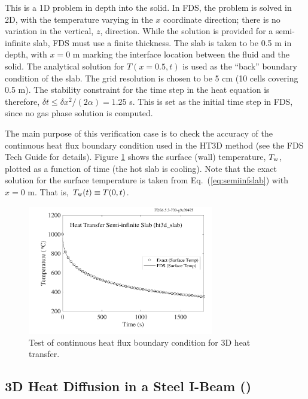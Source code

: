 \documentclass[11pt]{book}
\begin{document}
This is a 1D problem in depth into the solid.  In FDS, the problem is solved in 2D, with the temperature varying in the $x$ coordinate direction; there is no variation in the vertical, $z$, direction.  While the solution is provided for a semi-infinite slab, FDS must use a finite thickness.  The slab is taken to be 0.5 m in depth, with $x=0$ m marking the interface location between the fluid and the solid.  The analytical solution for $T(x=0.5,t)$ is used as the ``back'' boundary condition of the slab.  The grid resolution is chosen to be 5 cm (10 cells covering 0.5 m).  The stability constraint for the time step in the heat equation is therefore, $\delta t \le \delta x^2/(2\alpha) = 1.25$ s.  This is set as the initial time step in FDS, since no gas phase solution is computed.

The main purpose of this verification case is to check the accuracy of the continuous heat flux boundary condition used in the HT3D method (see the FDS Tech Guide \cite{FDS_Math_Guide} for details).  Figure \ref{fig:ht3d_slab} shows the surface (wall) temperature, $T_{\rm w}$, plotted as a function of time (the hot slab is cooling).  Note that the exact solution for the surface temperature is taken from Eq.~(\ref{eq:semiinfslab}) with $x=0$ m.  That is, $T_{\rm w}(t) \equiv T(0,t)$.

\begin{figure}[ht]
\centering
\includegraphics[width=3.2in]{SCRIPT_FIGURES/ht3d_slab}
\caption[The  test cases]{Test of continuous heat flux boundary condition for 3D heat transfer.}
\label{fig:ht3d_slab}
\end{figure}

\subsection{3D Heat Diffusion in a Steel I-Beam (\texorpdfstring{}{ht3d\_ibeam})}
\label{ht3d_ibeam}
\end{document}
